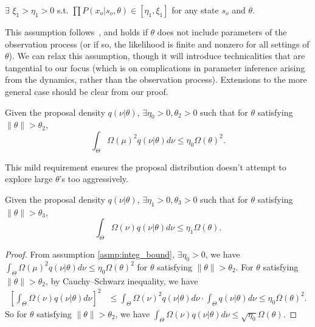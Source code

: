 \begin{assumption}
$\exists$ $ \xi_1 > \eta_1 > 0$ s.t.
$\prod P(x_o | s_o, \theta) \in [\eta_1, \xi_1]$ for any state $s_o$ and $\theta$.%
  \label{asmp:obs_bnd}
\end{assumption}
\noindent This assumption follows~\cite{miasojedow2017}, and holds if
$\theta$ does not include parameters of the observation process (or if so,
the likelihood is finite and nonzero for all settings of $\theta$). We can relax this assumption,
though it will introduce technicalities that are tangential to our focus
(which is on complications in parameter inference arising from the
dynamics, rather than the observation process). Extensions to the more
general case should be clear from our proof.

\begin{assumption}
Given the proposal density $q(\nu | \theta)$, $\exists \eta_0 > 0, \theta_2 > 0$ such that for $\theta$ satisfying $\parallel \theta \parallel  > \theta_2$, $$ \int_\Theta \Omega(\mu)^2 q(\nu | \theta)d\nu \leq \eta_0 \Omega(\theta)^2.$$
\label{asmp:integ_bound}
\end{assumption}
\noindent This mild requirement ensures the proposal distribution doesn't attempt
to explore large $\theta$'s too aggressively.
\begin{corollary}
Given the proposal density $q(\nu | \theta)$, $\exists \eta_1 > 0, \theta_3 > 0$ such that for $\theta$ satisfying $\parallel \theta \parallel  > \theta_3$, $$ \int_\Theta \Omega(\nu) q(\nu | \theta)d\nu \leq \eta_1 \Omega(\theta).$$
\label{corol:integ_bound}
\end{corollary}
\begin{proof}
From assumption \ref{asmp:integ_bound},  $\exists \eta_0 > 0$, we have $ \int_\Theta \Omega(\mu)^2 q(\nu | \theta)d\nu \leq \eta_0 \Omega(\theta)^2$ for $\theta$ satisfying $\parallel \theta \parallel  > \theta_2$.
For $\theta$ satisfying $\parallel \theta \parallel  > \theta_2$, by Cauchy–Schwarz inequality, we have
\begin{align*}
\left[ \int_\Theta \Omega(\nu) q(\nu | \theta) d\nu \right]^2 &\le \int_\Theta \Omega(\nu)^2 q(\nu | \theta) d\nu \cdot \int_\Theta q(\nu | \theta) d\nu \le \eta_0 \Omega(\theta)^2.
\end{align*}
So for $\theta$ satisfying $\parallel \theta \parallel  > \theta_2$, we have $\int_\Theta \Omega(\nu) q(\nu | \theta) d\nu \le \sqrt{\eta_0} \Omega(\theta).$
\end{proof}

